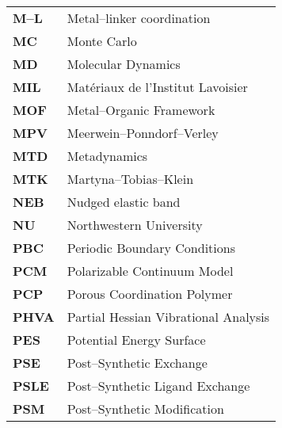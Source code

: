 \begin{longtable}{p{} p{}}
\textbf{M--L} & Metal--linker coordination \\
\textbf{MC} & Monte Carlo \\
\textbf{MD} & Molecular Dynamics \\
\textbf{MIL} & Mat{\'e}riaux de l'Institut Lavoisier \\
\textbf{MOF} & Metal--Organic Framework \\
\textbf{MPV} & Meerwein--Ponndorf--Verley\\
\textbf{MTD} & Metadynamics \\
\textbf{MTK} & Martyna--Tobias--Klein \\
\textbf{NEB} & Nudged elastic band \\
\textbf{NU} & Northwestern University \\
\textbf{PBC} & Periodic Boundary Conditions \\
\textbf{PCM} & Polarizable Continuum Model \\
\textbf{PCP} & Porous Coordination Polymer \\
\textbf{PHVA} & Partial Hessian Vibrational Analysis \\
\textbf{PES} & Potential Energy Surface \\
\textbf{PSE} & Post--Synthetic Exchange\\
\textbf{PSLE} & Post--Synthetic Ligand Exchange\\
\textbf{PSM} & Post--Synthetic Modification\\

\end{longtable}
